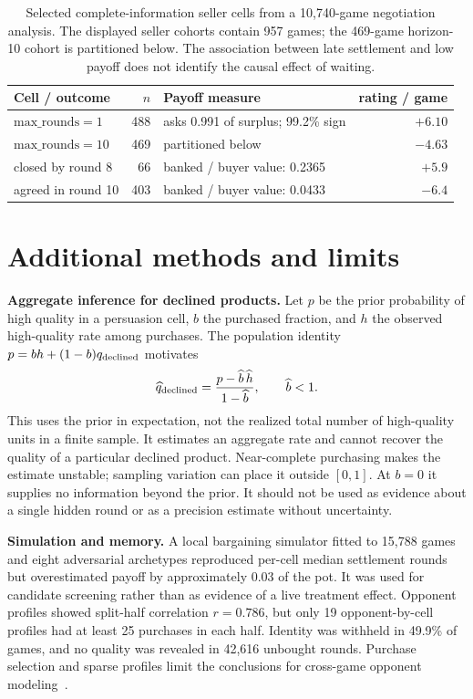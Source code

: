 \begin{table}[H]
\centering\small
\caption{Selected complete-information seller cells from a 10,740-game
negotiation analysis. The displayed seller cohorts contain 957 games; the
469-game horizon-10 cohort is partitioned below. The association between late
settlement and low payoff does not identify the causal effect of waiting.}
\label{tab:endgame}
\begin{tabular}{@{}lrlr@{}}
\toprule
Cell / outcome & $n$ & Payoff measure & rating / game\\
\midrule
$\mathrm{max\_rounds}=1$ & 488 & asks 0.991 of surplus; 99.2\% sign & $+6.10$\\
$\mathrm{max\_rounds}=10$ & 469 & partitioned below & $-4.63$\\
\quad closed by round 8 & 66 & banked / buyer value: 0.2365 & $+5.9$\\
\quad agreed in round 10 & 403 & banked / buyer value: 0.0433 & $-6.4$\\
\bottomrule
\end{tabular}
\end{table}

\section{Additional methods and limits}
\label{app:lim}
\textbf{Aggregate inference for declined products.} Let $p$ be the prior
probability of high quality in a persuasion cell, $b$ the purchased fraction,
and $h$ the observed high-quality rate among purchases. The population identity
$p=bh+(1-b)q_{\rm declined}$ motivates
\[
\widehat q_{\rm declined}=\frac{p-\widehat b\,\widehat h}{1-\widehat b},
\qquad \widehat b<1.
\]
This uses the prior in expectation, not the realized total number of high-quality
units in a finite sample. It estimates an aggregate rate and cannot recover the
quality of a particular declined product. Near-complete purchasing makes the
estimate unstable; sampling variation can place it outside $[0,1]$. At $b=0$
it supplies no information beyond the prior. It should not be used as evidence
about a single hidden round or as a precision estimate without uncertainty.

\textbf{Simulation and memory.} A local bargaining simulator fitted to 15,788
games and eight adversarial archetypes reproduced per-cell median settlement
rounds but overestimated payoff by approximately 0.03 of the pot. It was used
for candidate screening rather than as evidence of a live treatment effect.
Opponent profiles showed split-half correlation $r=0.786$, but only 19
opponent-by-cell profiles had at least 25 purchases in each half. Identity was
withheld in 49.9\% of games, and no quality was revealed in 42,616 unbought
rounds. Purchase selection and sparse profiles limit the conclusions for
cross-game opponent modeling~\cite{baarslag2016survey}.

